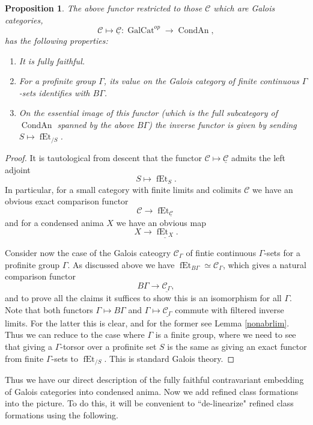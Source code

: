 \documentclass[12pt]{article}
\newtheorem{proposition}[theorem]{Proposition}
\theoremstyle{definition}
\newcommand{\on}{\operatorname}
\newcommand{\mc}{\mathcal}
\newcommand{\ul}{\underline}
\begin{document}
\begin{proposition}
The above functor restricted to those $\mc{C}$ which are Galois categories,
$$\mc{C} \mapsto \ul{\mc{C}}: \on{GalCat}^{op} \to \on{CondAn},$$
has the following properties:
\begin{enumerate}
\item It is fully faithful.
\item For a profinite group $\Gamma$, its value on the Galois category of finite continuous $\Gamma$-sets identifies with $B\Gamma$.
\item On the essential image of this functor (which is the full subcategory of $\on{CondAn}$ spanned by the above $B\Gamma$) the inverse functor is given by sending $S\mapsto \on{fEt}_{/S}$.
\end{enumerate}
\end{proposition}
\begin{proof}
It is tautological from descent that the functor $\mc{C} \mapsto \ul{\mc{C}}$ admits the left adjoint
$$S\mapsto \on{fEt}_S.$$
In particular, for a small category with finite limits and colimits $\mc{C}$ we have an obvious exact comparison functor
$$\mc{C} \to \on{fEt}_{\ul{\mc{C}}}$$
and for a condensed anima $X$ we have an obvious map
$$X \to \ul{\on{fEt}_X}.$$

Consider now the case of the Galois cateogry $\mc{C}_\Gamma$ of fintie continuous $\Gamma$-sets for a profinite group $\Gamma$.  As discussed above we have $\on{fEt}_{B\Gamma}\simeq \mc{C}_\Gamma$, which gives a natural comparison functor
$$B\Gamma \to \ul{\mc{C}_\Gamma},$$
and to prove all the claims it suffices to show this is an isomorphism for all $\Gamma$.
Note that both functors $\Gamma \mapsto B\Gamma$ and $\Gamma \mapsto \ul{\mc{C}_\Gamma}$ commute with filtered inverse limits.  For the latter this is clear, and for the former see Lemma \ref{nonabrlim}.  Thus we can reduce to the case where $\Gamma$ is a finite group, where we need to see that giving a $\Gamma$-torsor over a profinite set $S$ is the same as giving an exact functor from finite $\Gamma$-sets to $\on{fEt}_{/S}$.  This is standard Galois theory.
\end{proof}

Thus we have our direct description of the fully faithful contravariant embedding of Galois categories into condensed anima.  Now we add refined class formations into the picture.  To do this, it will be convenient to ``de-linearize" refined class formations using the following.
\end{document}
